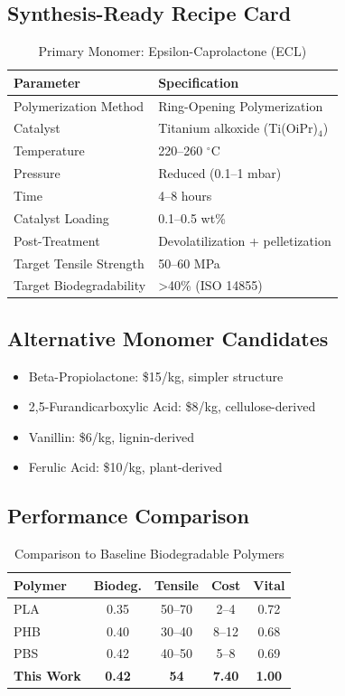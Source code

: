 \documentclass[11pt]{article}
\begin{document}
\subsection{Synthesis-Ready Recipe Card}

\begin{table}[h]
\centering
\caption{Primary Monomer: Epsilon-Caprolactone (ECL)}
\begin{tabular}{ll}
\toprule
\textbf{Parameter} & \textbf{Specification} \\
\midrule
Polymerization Method & Ring-Opening Polymerization \\
Catalyst & Titanium alkoxide (Ti(OiPr)$_4$) \\
Temperature & 220--260 $^\circ$C \\
Pressure & Reduced (0.1--1 mbar) \\
Time & 4--8 hours \\
Catalyst Loading & 0.1--0.5 wt\% \\
Post-Treatment & Devolatilization + pelletization \\
Target Tensile Strength & 50--60 MPa \\
Target Biodegradability & >40\% (ISO 14855) \\
\bottomrule
\end{tabular}
\end{table}

\subsection{Alternative Monomer Candidates}

\begin{itemize}
    \item Beta-Propiolactone: \$15/kg, simpler structure
    \item 2,5-Furandicarboxylic Acid: \$8/kg, cellulose-derived
    \item Vanillin: \$6/kg, lignin-derived
    \item Ferulic Acid: \$10/kg, plant-derived
\end{itemize}

\subsection{Performance Comparison}

\begin{table}[h]
\centering
\caption{Comparison to Baseline Biodegradable Polymers}
\begin{tabular}{lcccc}
\toprule
\textbf{Polymer} & \textbf{Biodeg.} & \textbf{Tensile} & \textbf{Cost} & \textbf{Vital} \\
\midrule
PLA & 0.35 & 50--70 & 2--4 & 0.72 \\
PHB & 0.40 & 30--40 & 8--12 & 0.68 \\
PBS & 0.42 & 40--50 & 5--8 & 0.69 \\
\textbf{This Work} & \textbf{0.42} & \textbf{54} & \textbf{7.40} & \textbf{1.00} \\
\bottomrule
\end{tabular}
\end{table}
\end{document}
